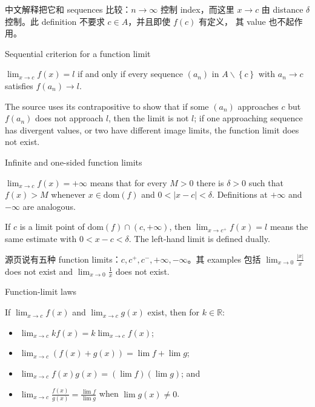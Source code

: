 中文解释把它和 sequences 比较：\(n\rightarrow\infty\) 控制 index，而这里 \(x\rightarrow c\) 由 distance \(\delta\) 控制。此 definition 不要求 \(c \in A\)，并且即使 \(f(c)\) 有定义， 其 value 也不起作用。

\begin{theorem}{Sequential criterion for a function limit}

\(\lim_{x\rightarrow c}f(x) = l\) if and only if every sequence \(\left( a_{n} \right)\) in \(A \smallsetminus \left\{ c \right\}\) with \(a_{n}\rightarrow c\) satisfies \(f\left( a_{n} \right)\rightarrow l\).

\end{theorem}

The source uses its contrapositive to show that if some \(\left( a_{n} \right)\) approaches \(c\) but \(f\left( a_{n} \right)\) does not approach \(l\), then the limit is not \(l\); if one approaching sequence has divergent values, or two have different image limits, the function limit does not exist.

\begin{definition}{Infinite and one-sided function limits}

\(\lim_{x\rightarrow c}f(x) = + \infty\) means that for every \(M > 0\) there is \(\delta > 0\) such that \(f(x) > M\) whenever \(x \in \text{dom}(f)\) and \(0 < \left| {x - c} \right| < \delta\). Definitions at \(+ \infty\) and \(- \infty\) are analogous.

If \(c\) is a limit point of \(\text{dom}(f) \cap \left( {c, + \infty} \right)\), then \(\lim_{x\rightarrow c^{+}}f(x) = l\) means the same estimate with \(0 < x - c < \delta\). The left-hand limit is defined dually.

\end{definition}

源页说有五种 function limits：\(c,c^{+},c^{-}, + \infty, - \infty\)。其 examples 包括 \(\lim_{x\rightarrow 0}\frac{|x|}{x}\) does not exist and \(\lim_{x\rightarrow 0}\frac{1}{x}\) does not exist.

\begin{theorem}{Function-limit laws}

If \(\lim_{x\rightarrow c}f(x)\) and \(\lim_{x\rightarrow c}g(x)\) exist, then for \(k \in \mathbb{R}\):

\begin{itemize}
\tightlist
\item
  \(\lim_{x\rightarrow c}kf(x) = k\lim_{x\rightarrow c}f(x)\);
\item
  \(\lim_{x\rightarrow c}\left( {f(x) + g(x)} \right) = \lim f + \lim g\);
\item
  \(\lim_{x\rightarrow c}f(x)g(x) = \left( {\lim f} \right)\left( {\lim g} \right)\); and
\item
  \(\lim_{x\rightarrow c}\frac{f(x)}{g(x)} = \frac{\lim f}{\lim g}\) when \(\lim g(x) \neq 0\).
\end{itemize}

\end{theorem}

